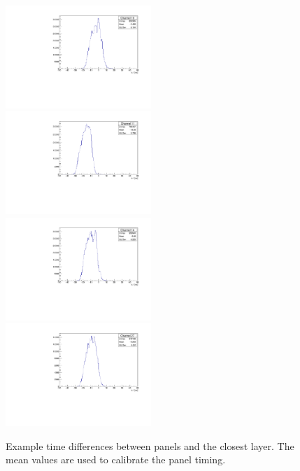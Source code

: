 \documentclass[12pt]{article}
\begin{document}
\begin{figure}
    \centering
    \includegraphics[width=0.49\textwidth]{figures/timingPlots/panels/Channel_10.pdf}~
    \includegraphics[width=0.49\textwidth]{figures/timingPlots/panels/Channel_11.pdf}\\
    \includegraphics[width=0.49\textwidth]{figures/timingPlots/panels/Channel_14.pdf}~
    \includegraphics[width=0.49\textwidth]{figures/timingPlots/panels/Channel_27.pdf}
    \caption{\label{fig:timeDiffPanelLayer} Example time differences between panels and the closest layer. 
    The mean values are used to calibrate the panel timing.}
\end{figure}
\end{document}

